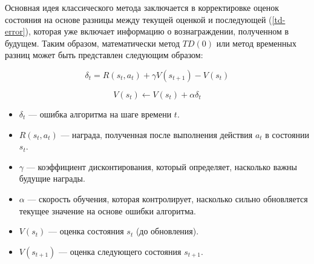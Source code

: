 Основная идея классического метода заключается в корректировке оценок состояния на основе разницы между текущей оценкой и последующей (\ref{td-error}), которая уже включает информацию о вознаграждении, полученном в будущем. Таким образом, математически метод $TD(0)$ или метод временных разниц может быть представлен следующим образом:

\pagebreak

\begin{equation}\label{td-error}
    \delta_t = R(s_t, a_t) + \gamma V(s_{t+1}) - V(s_t)
\end{equation}

\begin{equation}\label{td-base}
    V(s_t) \leftarrow V(s_t) + \alpha \delta_t
\end{equation}

\begin{itemize}
    \item $\delta_t$ --- ошибка алгоритма на шаге времени $t$.
    \item $R(s_t, a_t)$ --- награда, полученная после выполнения действия $a_t$ в состоянии $s_t$.
    \item $\gamma$ --- коэффициент дисконтирования, который определяет, насколько важны будущие награды.
    \item $\alpha$ — скорость обучения, которая контролирует, насколько сильно обновляется текущее значение на основе ошибки алгоритма.
    \item $V(s_t)$ --- оценка состояния $s_t$ (до обновления).
    \item $V(s_{t+1})$ --- оценка следующего состояния $s_{t+1}$.
\end{itemize}

